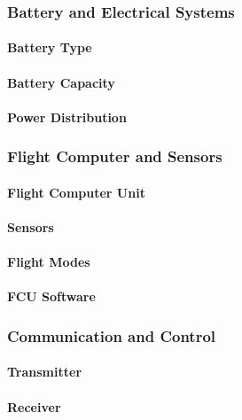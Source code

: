 \subsubsection{Battery and Electrical Systems}
\paragraph{Battery Type}
\paragraph{Battery Capacity}
\paragraph{Power Distribution}

\subsubsection{Flight Computer and Sensors}
\paragraph{Flight Computer Unit}
\paragraph{Sensors}
\paragraph{Flight Modes}
\paragraph{FCU Software}

\subsubsection{Communication and Control}
\paragraph{Transmitter}
\paragraph{Receiver}